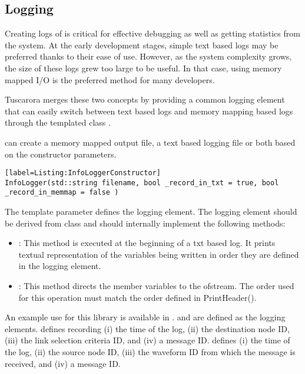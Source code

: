 \subsection{Logging}
Creating logs of is critical for effective debugging as well as getting statistics from the system. At the early development stages, simple text based logs may be preferred thanks to their ease of use. However, as the system complexity grows, the size of these logs grew too large to be useful. In that case, using memory mapped I/O is the preferred method for many developers. 

Tuscarora merges these two concepts by providing a common logging element that can easily switch between text based logs and memory mapping based logs through the templated class \CPPClassName{>}.

\CPPClassName{>} can create a memory mapped output file, a text based logging file or both based on the constructor parameters. 

\begin{lstlisting}[style=boralargefileNoNumbers][label=Listing:InfoLoggerConstructor]
InfoLogger(std::string filename, bool _record_in_txt = true, bool _record_in_memmap = false )
\end{lstlisting}

The template parameter  defines the logging element. The logging element should be derived from  class and should internally implement the following methods:

\begin{itemize}

\item {}: This method is executed at the beginning of a txt based log. It prints textual representation of the variables being written in order they are defined in the logging element. 

\item {} : This method directs the member variables to the ofstream. The order used for this operation must match the order defined in PrintHeader().

\end{itemize}

An example use for this library is available in .  and  are defined as the logging elements.  defines recording (i) the time of the log, (ii) the destination node ID, (iii) the link selection criteria ID, and (iv) a message ID.  defines (i) the time of the log, (ii) the source node ID, (iii) the waveform ID from which the message is received, and (iv) a message ID.

